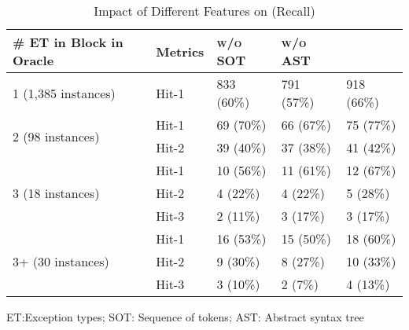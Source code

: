 
\begin{table}[t]
  \caption{Impact of Different Features on {\xtype} (Recall)}
  \vspace{-12pt}
	\tabcolsep 2pt
	{\small
		\begin{center}
			\renewcommand{\arraystretch}{1}
			\begin{tabular}{p{2cm}<{\centering}|p{1cm}<{\centering}|p{1.5cm}<{\centering}|p{1.5cm}<{\centering}|p{1.5cm}<{\centering}}
				\hline
				\# ET in \code{Try-Catch} Block in Oracle & Metrics &{\textsc{\tool w/o SOT}\xspace}&{\textsc{\tool w/o AST}\xspace}& {\textsc{\tool}\xspace} \\
				\hline
				\multirow{1}{*}{1 (1,385 instances)} & Hit-1  &833 (60\%)& 791 (57\%)& 918 (66\%) \\
				\hline
				\multirow{2}{*}{2 (98 instances)}    & Hit-1  &69 (70\%)& 66 (67\%)& 75 (77\%) \\
				                                     & Hit-2  &39 (40\%)& 37 (38\%)&  41 (42\%) \\
				\hline
				\multirow{3}{*}{3 (18 instances)}    & Hit-1  &10 (56\%)&11 (61\%)& 12 (67\%) \\
				                                     & Hit-2  &4 (22\%)& 4 (22\%)& 5 (28\%)\\
				                                     & Hit-3  &2 (11\%)& 3 (17\%)& 3 (17\%) \\
				\hline
				\multirow{4}{*}{3+ (30 instances)}   & Hit-1  &16 (53\%)&15 (50\%)& 18 (60\%) \\
				                                     & Hit-2  &9 (30\%)& 8 (27\%)& 10 (33\%) \\
				                                     & Hit-3  &3 (10\%)& 2 (7\%)& 4 (13\%)\\
				\hline
			\end{tabular}
		ET:Exception types; SOT: Sequence of tokens; AST: Abstract syntax tree		
			\label{tab:sensi-xtype-recall}
		\end{center}
	}
\end{table}

